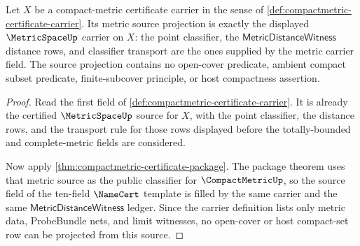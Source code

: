\begin{theorem}
\label{thm:compactmetric-metric-source-obligation}
Let $X$ be a compact-metric certificate carrier in the sense of
\autoref{def:compactmetric-certificate-carrier}. Its metric source projection is
exactly the displayed $\MetricSpaceUp$ carrier on $X$: the point classifier, the
$\mathsf{MetricDistanceWitness}$ distance rows, and classifier transport are the
ones supplied by the metric carrier field. The source projection contains no
open-cover predicate, ambient compact subset predicate, finite-subcover
principle, or host compactness assertion.
\end{theorem}
\begin{proof}
Read the first field of \autoref{def:compactmetric-certificate-carrier}. It is
already the certified $\MetricSpaceUp$ source for $X$, with the point
classifier, the distance rows, and the transport rule for those rows displayed
before the totally-bounded and complete-metric fields are considered.

Now apply \autoref{thm:compactmetric-certificate-package}. The package theorem
uses that metric source as the public classifier for $\CompactMetricUp$, so the
source field of the ten-field $\NameCert$ template is filled by the same carrier
and the same $\mathsf{MetricDistanceWitness}$ ledger. Since the carrier
definition lists only metric data, ProbeBundle nets, and limit witnesses, no
open-cover or host compact-set row can be projected from this source.
\end{proof}

